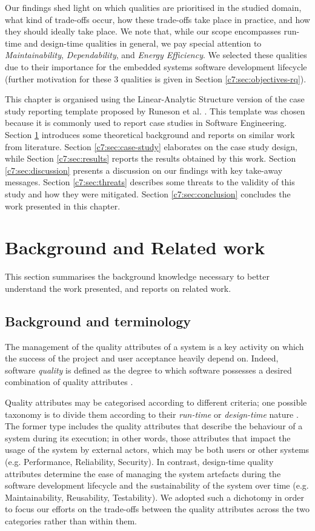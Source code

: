 Our findings shed light on which qualities are prioritised in the studied domain, what kind of trade-offs occur, how these trade-offs take place in practice, and how they should ideally take place. We note that, while our scope encompasses run-time and design-time qualities in general, we pay special attention to  \textit{Maintainability}, \textit{Dependability}, and \textit{Energy Efficiency}. We selected these qualities due to their importance for the embedded systems software development lifecycle \cite{Knight2002,Koopman2004} (further motivation for these 3 qualities is given in Section \ref{c7:sec:objectives-rq}). 

This chapter is organised using the Linear-Analytic Structure version of the case study reporting template proposed by Runeson et al. \cite{Runeson2012}. This template was chosen because it is commonly used to report case studies in Software Engineering.
Section \ref{c7:sec:background} introduces some theoretical background and reports on similar work from literature.
Section \ref{c7:sec:case-study} elaborates on the case study design, while Section \ref{c7:sec:results} reports the results obtained by this work. Section \ref{c7:sec:discussion} presents a discussion on our findings with key take-away messages.
Section \ref{c7:sec:threats} describes some threats to the validity of this study and how they were mitigated.
Section \ref{c7:sec:conclusion} concludes the work presented in this chapter.

\section{Background and Related work}\label{c7:sec:background}
This section summarises the background knowledge necessary to better understand the work presented, and reports on related work.

\subsection{Background and terminology}
The management of the quality attributes of a system is a key activity on which the success of the project and user acceptance heavily depend on.
Indeed, software \textit{quality} is defined as the degree to which software possesses a desired combination of quality attributes \cite{Barbacci1995,IEEE10611992}.

Quality attributes may be categorised according to different criteria; one possible taxonomy is to divide them according to their \textit{run-time} or \textit{design-time} nature \cite{Bass2012}.
The former type includes the quality attributes that describe the behaviour of a system during its execution; in other words, those attributes that impact the usage of the system by external actors, which may be both users or other systems (e.g. Performance, Reliability, Security).
In contrast, design-time quality attributes determine the ease of managing the system artefacts during the software development lifecycle and the sustainability of the system over time (e.g. Maintainability, Reusability, Testability). We adopted such a dichotomy in order to focus our efforts on the trade-offs between the quality attributes across the two categories rather than within them.

